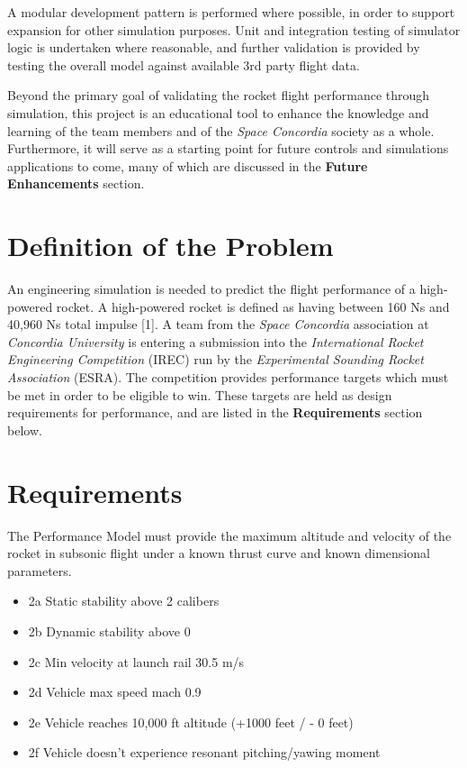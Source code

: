 \documentclass[]{book}
\providecommand{\tightlist}{%
  \setlength{\itemsep}{0pt}\setlength{\parskip}{0pt}}
\begin{document}
A modular development pattern is performed where possible, in order to
support expansion for other simulation purposes. Unit and integration
testing of simulator logic is undertaken where reasonable, and further
validation is provided by testing the overall model against available
3rd party flight data.

Beyond the primary goal of validating the rocket flight performance
through simulation, this project is an educational tool to enhance the
knowledge and learning of the team members and of the \emph{Space
Concordia} society as a whole. Furthermore, it will serve as a starting
point for future controls and simulations applications to come, many of
which are discussed in the \textbf{Future Enhancements} section.

\section{Definition of the Problem}\label{definition-of-the-problem}

An engineering simulation is needed to predict the flight performance of
a high-powered rocket. A high-powered rocket is defined as having
between 160 Ns and 40,960 Ns total impulse {[}1{]}. A team from the
\emph{Space Concordia} association at \emph{Concordia University} is
entering a submission into the \emph{International Rocket Engineering
Competition} (IREC) run by the \emph{Experimental Sounding Rocket
Association} (ESRA). The competition provides performance targets which
must be met in order to be eligible to win. These targets are held as
design requirements for performance, and are listed in the
\textbf{Requirements} section below.

\section{Requirements}\label{requirements}

The Performance Model must provide the maximum altitude and velocity of
the rocket in subsonic flight under a known thrust curve and known
dimensional parameters.

\begin{itemize}
\tightlist
\item
  2a Static stability above 2 calibers
\item
  2b Dynamic stability above 0
\item
  2c Min velocity at launch rail 30.5 m/s
\item
  2d Vehicle max speed mach 0.9
\item
  2e Vehicle reaches 10,000 ft altitude (+1000 feet / - 0 feet)
\item
  2f Vehicle doesn't experience resonant pitching/yawing moment
\end{itemize}
\end{document}

